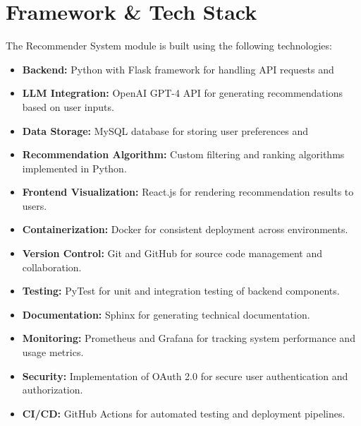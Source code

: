 \section{Framework \& Tech Stack}
The Recommender System module is built using the following technologies:
\begin{itemize}
    \item \textbf{Backend:} Python with Flask framework for handling API requests and
    \item \textbf{LLM Integration:} OpenAI GPT-4 API for generating recommendations based on user inputs.
    \item \textbf{Data Storage:} MySQL database for storing user preferences and
    \item \textbf{Recommendation Algorithm:} Custom filtering and ranking algorithms implemented in Python.
    \item \textbf{Frontend Visualization:} React.js for rendering recommendation results to users.
    \item \textbf{Containerization:} Docker for consistent deployment across environments.
    \item   \textbf{Version Control:} Git and GitHub for source code management and collaboration.
    \item \textbf{Testing:} PyTest for unit and integration testing of backend components.
    \item \textbf{Documentation:} Sphinx for generating technical documentation.
    \item \textbf{Monitoring:} Prometheus and Grafana for tracking system performance and usage metrics.
    \item \textbf{Security:} Implementation of OAuth 2.0 for secure user authentication and authorization.
    \item \textbf{CI/CD:} GitHub Actions for automated testing and deployment pipelines.
\end{itemize}

